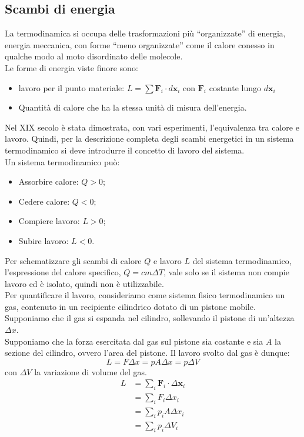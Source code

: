 \documentclass[12pt]{report}
\begin{document}
	\subsection{Scambi di energia}
	La termodinamica si occupa delle trasformazioni più ``organizzate'' di energia, energia meccanica, con forme ``meno organizzate'' come il calore conesso in qualche modo al moto disordinato delle molecole. \\
	Le forme di energia viste finore sono:
	\begin{itemize}
		\item lavoro per il punto materiale: $L = \sum \textbf{F}_i \cdot d\textbf{x}_i$ con $\textbf{F}_i$ costante lungo $d\textbf{x}_i$
		\item Quantità di calore che ha la stessa unità di misura dell'energia.
	\end{itemize}
	Nel XIX secolo è stata dimostrata, con vari esperimenti, l'equivalenza tra calore e lavoro. Quindi, per la descrizione completa degli scambi energetici in un sistema termodinamico si deve introdurre il concetto di lavoro del sistema. \\
	Un sistema termodinamico può:
	\begin{itemize}
		\item Assorbire calore: $Q > 0$;
		\item Cedere calore: $Q < 0$;
		\item Compiere lavoro: $L > 0$;
		\item Subire lavoro: $L < 0$.
	\end{itemize}
	Per schematizzare gli scambi di calore $Q$ e lavoro $L$ del sistema termodinamico, l'espressione del calore specifico, $Q = cm\Delta T$, vale solo se il sistema non compie lavoro ed è isolato, quindi non è utilizzabile. \\
	Per quantificare il lavoro, consideriamo come sistema fisico termodinamico un gas, contenuto in un recipiente cilindrico dotato di un pistone mobile. Supponiamo che il gas si espanda nel cilindro, sollevando il pistone di un'altezza $\Delta x$. \\
	Supponiamo che la forza esercitata dal gas sul pistone sia costante e sia $A$ la sezione del cilindro, ovvero l'area del pistone. Il lavoro svolto dal gas è dunque:
	\[
	L = F\Delta x = pA\Delta x = p\Delta V
	\]
	con $\Delta V$ la variazione di volume del gas.
	\begin{align*}
		L &= \sum_{i}\textbf{F}_i \cdot \Delta \textbf{x}_i \\
		&= \sum_{i}F_i\Delta x_i \\
		&= \sum_{i}p_iA \Delta x_i \\
		&= \sum_{i}p_i\Delta V_i
	\end{align*}
\end{document}
